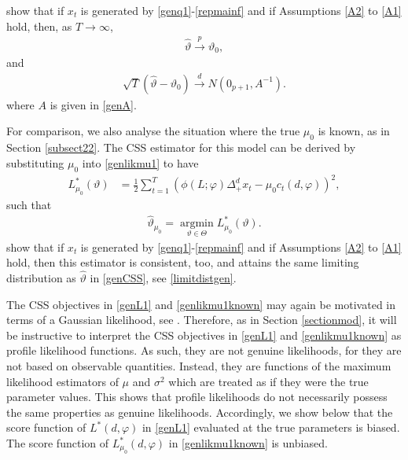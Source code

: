 {{\textcite{hualde2020truncated} show that if $x_t$ is generated by \eqref{genq1}-\eqref{repmainf} and if Assumptions \ref{A2} to \ref{A1} hold, then, as $T \rightarrow \infty$,  
\begin{align}
    \hat{\vartheta} \overset{p}{\rightarrow} \vartheta_0, 
\end{align}
and
\begin{align}
    \sqrt{T} (\hat{\vartheta} - \vartheta_0 ) \xrightarrow{d} N(0_{p+1},A^{-1}). \label{limitdistgen}
\end{align}
where $A$ is given in \eqref{genA}.

For comparison, we also analyse the situation where the true $\mu_0$ is known, as in Section \ref{subsect22}. The CSS estimator for this model can be derived by substituting $\mu_0$ into \eqref{genlikmu1} to have 
\begin{align}
    L^*_{\mu_0}(\vartheta)   &=   \frac{1}{2} \sum_{t = 1}^T \left(  \phi(L;\varphi)\Delta_{+}^{d} x_t- \mu_0 c_t(d,\varphi)  \right)^2, \label{genlikmu1known}
\end{align}
such that 
\begin{align}
    \hat{\vartheta}_{\mu_0} = \operatorname*{argmin}_{\vartheta \in \Theta} L^*_{\mu_0}(\vartheta). \label{genCSSmuknown}
\end{align}
\textcite{hualde2011gaussian} show that if $x_t$ is generated by \eqref{genq1}-\eqref{repmainf} and if Assumptions \ref{A2} to \ref{A1} hold, then this estimator is consistent, too, and attains the same limiting distribution as $\hat{\vartheta}$ in \eqref{genCSS}, see \eqref{limitdistgen}.  

The CSS objectives in \eqref{genL1} and \eqref{genlikmu1known} may again be motivated in terms of a Gaussian likelihood, see \textcite{hualde2020truncated}. Therefore, as in Section \ref{sectionmod}, it will be instructive to interpret the CSS objectives in \eqref{genL1} and \eqref{genlikmu1known} as profile likelihood functions. As such, they are not genuine likelihoods, for they are not based on observable quantities. Instead, they are functions of the maximum likelihood estimators of $\mu$ and $\sigma^2$ which are treated as if they were the true parameter values. This shows that profile likelihoods do not necessarily possess the same properties as genuine likelihoods. Accordingly, we show below that the score function of $L^*(d,\varphi)$ in \eqref{genL1} evaluated at the true parameters is biased. The score function of $L^*_{\mu_0}(d,\varphi)$ in \eqref{genlikmu1known} is unbiased.

}}
